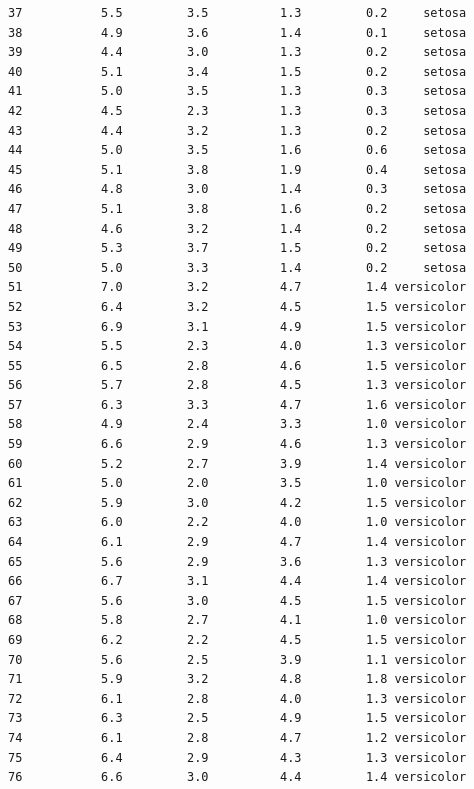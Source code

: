 \documentclass[
  letterpaper,
  DIV=11,
  numbers=noendperiod]{scrreprt}
\begin{document}
\begin{verbatim}
37           5.5         3.5          1.3         0.2     setosa
38           4.9         3.6          1.4         0.1     setosa
39           4.4         3.0          1.3         0.2     setosa
40           5.1         3.4          1.5         0.2     setosa
41           5.0         3.5          1.3         0.3     setosa
42           4.5         2.3          1.3         0.3     setosa
43           4.4         3.2          1.3         0.2     setosa
44           5.0         3.5          1.6         0.6     setosa
45           5.1         3.8          1.9         0.4     setosa
46           4.8         3.0          1.4         0.3     setosa
47           5.1         3.8          1.6         0.2     setosa
48           4.6         3.2          1.4         0.2     setosa
49           5.3         3.7          1.5         0.2     setosa
50           5.0         3.3          1.4         0.2     setosa
51           7.0         3.2          4.7         1.4 versicolor
52           6.4         3.2          4.5         1.5 versicolor
53           6.9         3.1          4.9         1.5 versicolor
54           5.5         2.3          4.0         1.3 versicolor
55           6.5         2.8          4.6         1.5 versicolor
56           5.7         2.8          4.5         1.3 versicolor
57           6.3         3.3          4.7         1.6 versicolor
58           4.9         2.4          3.3         1.0 versicolor
59           6.6         2.9          4.6         1.3 versicolor
60           5.2         2.7          3.9         1.4 versicolor
61           5.0         2.0          3.5         1.0 versicolor
62           5.9         3.0          4.2         1.5 versicolor
63           6.0         2.2          4.0         1.0 versicolor
64           6.1         2.9          4.7         1.4 versicolor
65           5.6         2.9          3.6         1.3 versicolor
66           6.7         3.1          4.4         1.4 versicolor
67           5.6         3.0          4.5         1.5 versicolor
68           5.8         2.7          4.1         1.0 versicolor
69           6.2         2.2          4.5         1.5 versicolor
70           5.6         2.5          3.9         1.1 versicolor
71           5.9         3.2          4.8         1.8 versicolor
72           6.1         2.8          4.0         1.3 versicolor
73           6.3         2.5          4.9         1.5 versicolor
74           6.1         2.8          4.7         1.2 versicolor
75           6.4         2.9          4.3         1.3 versicolor
76           6.6         3.0          4.4         1.4 versicolor

\end{verbatim}
\end{document}
